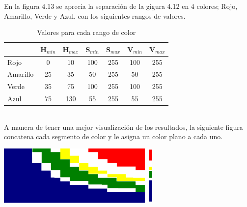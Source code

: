 En la figura 4.13 se aprecia la separación de la gigura 4.12 en 4 colores; Rojo, Amarillo, Verde y Azul.
con los siguientes rangos de valores.\\
\begin{table}[ht]
	\begin{center}
		\caption{Valores para cada rango de color}
		\begin{tabular}[t]{lcccccc}
			\hline
			         & H$_{min}$ & H$_{max}$ & S$_{min}$ & S$_{max}$ & V$_{min}$ & V$_{max}$ \\
			\hline
			Rojo     & 0         & 10        & 100       & 255       & 100       & 255       \\
			Amarillo & 25        & 35        & 50        & 255       & 50        & 255       \\
			Verde    & 35        & 75        & 100       & 255       & 100       & 255       \\
			Azul     & 75        & 130       & 55        & 255       & 55        & 255       \\
			\hline
		\end{tabular}
	\end{center}
\end{table}\\
A manera de tener una mejor visualización de los resultados, la siguiente figura concatena
cada segmento de color y le asigna un color plano a cada uno.
\begin{center}
	\includegraphics[width=0.6\textwidth]{Contenido/Cuerpo/Capitulo4/Fig6.eps}
	\label{Fig6}
\end{center}

